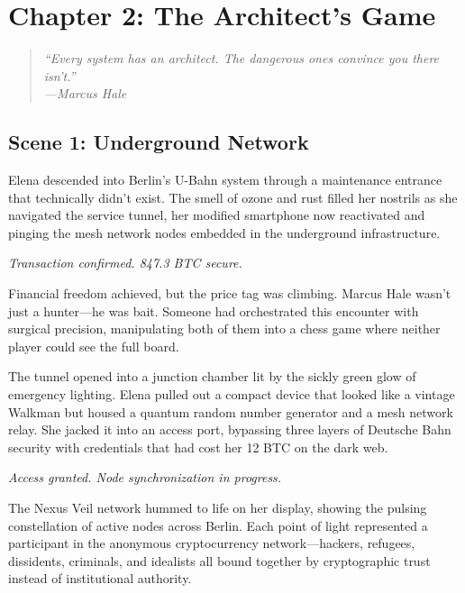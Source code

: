 \hypertarget{chapter-2-the-architects-game}{%
\section{Chapter 2: The Architect's Game}\label{chapter-2-the-architects-game}}

\begin{quote}
\itshape ``Every system has an architect. The dangerous ones convince you there
isn't.''\\
\normalfont\hfill---Marcus Hale
\end{quote}

\hypertarget{scene-1-underground-network}{%
\subsection{Scene 1: Underground Network}\label{scene-1-underground-network}}

Elena descended into Berlin's U-Bahn system through a maintenance entrance that technically didn't exist. The smell of ozone and rust filled her nostrils as she navigated the service tunnel, her modified smartphone now reactivated and pinging the mesh network nodes embedded in the underground infrastructure.

\emph{Transaction confirmed. 847.3 BTC secure.}

Financial freedom achieved, but the price tag was climbing. Marcus Hale wasn't just a hunter---he was bait. Someone had orchestrated this encounter with surgical precision, manipulating both of them into a chess game where neither player could see the full board.

The tunnel opened into a junction chamber lit by the sickly green glow of emergency lighting. Elena pulled out a compact device that looked like a vintage Walkman but housed a quantum random number generator and a mesh network relay. She jacked it into an access port, bypassing three layers of Deutsche Bahn security with credentials that had cost her 12 BTC on the dark web.

\emph{Access granted. Node synchronization in progress.}

The Nexus Veil network hummed to life on her display, showing the pulsing constellation of active nodes across Berlin. Each point of light represented a participant in the anonymous cryptocurrency network---hackers, refugees, dissidents, criminals, and idealists all bound together by cryptographic trust instead of institutional authority.

